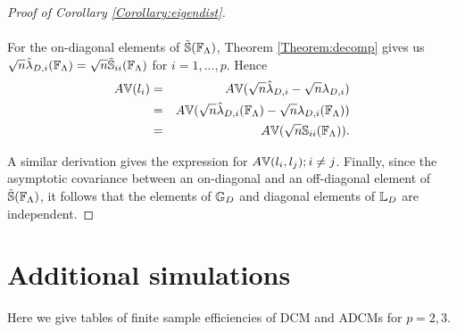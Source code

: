 \begin{proof}[Proof of Corollary \ref{Corollary:eigendist}]
\paragraph{}For the on-diagonal elements of $\tilde {{\mathbb{S}}}({\mathbb{F}}_\Lambda)$, Theorem \ref{Theorem:decomp} gives us $ \sqrt n \hat\lambda_{D,i} ( {\mathbb{F}}_\Lambda) = \sqrt n \tilde {{\mathbb{S}}}_{ii}({\mathbb{F}}_\Lambda)$ for $i = 1,...,p$. Hence
%
\begin{eqnarray*}
A{\mathbb{V}}(l_i) &=& A{\mathbb{V}}(\sqrt n \hat\lambda_{D,i} - \sqrt n \lambda_{D,i})\\
&=& A{\mathbb{V}}(\sqrt n \hat\lambda_{D,i} ({\mathbb{F}}_\Lambda) - \sqrt n \lambda_{D,i}({\mathbb{F}}_\Lambda))\\
&=& A{\mathbb{V}}(\sqrt n {\mathbb{S}}_{ii}({\mathbb{F}}_\Lambda)).
\end{eqnarray*}

A similar derivation gives the expression for $A{\mathbb{V}}(l_i,l_j); i \neq j$. Finally, since the asymptotic covariance between an on-diagonal and an off-diagonal element of $\tilde {{\mathbb{S}}}( {\mathbb{F}}_\Lambda)$, it follows that the elements of ${\mathbb{G}}_D$ and diagonal elements of ${\mathbb{L}}_D$ are independent.
\end{proof}

\section{Additional simulations}
\label{sec:appD}
Here we give tables of finite sample efficiencies of DCM and ADCMs for $p=2,3$.

